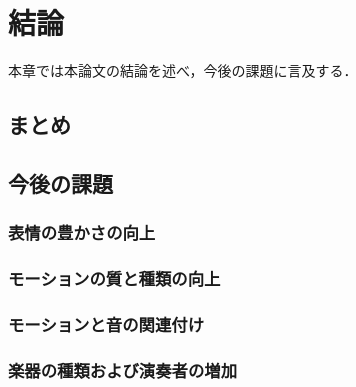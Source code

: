 \chapter{結論}
\label{chap:conclusion}
本章では本論文の結論を述べ，今後の課題に言及する．

\section{まとめ}

\section{今後の課題}

\subsection{表情の豊かさの向上}

\subsection{モーションの質と種類の向上}

\subsection{モーションと音の関連付け}

\subsection{楽器の種類および演奏者の増加}